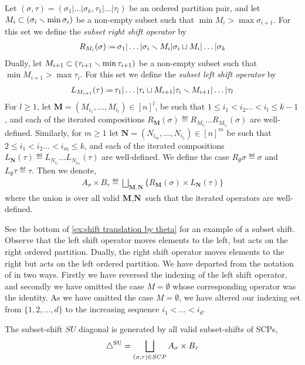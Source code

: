 \begin{definition} \label{def:subset shifts}
Let $(\sigma,\tau) = (\sigma_1|\dots|\sigma_k,\tau_1|\dots|\tau_l)$ be an ordered partition pair, and let $M_i\subset (\sigma_{i}\smallsetminus \min \sigma_{i})$ be a non-empty subset such that $\min M_i> \max \sigma_{i+1}$.
For this set we define the \emph{subset right shift operator} by
\begin{align*}
    R_{M_i}(\sigma) \eqdef  \sigma_1|\dots|\sigma_i \ssm M_i|\sigma_i \sqcup M_i|\dots|\sigma_k
\end{align*}
Dually, let $M_{i+1}\subset (\tau_{i+1}\smallsetminus \min \tau_{i+1})$  be a non-empty subset such that $\min M_{i+1}> \max \tau_{i}$.
For this set we define the \emph{subset left shift operator} by
\begin{align*}
    L_{M_{i+1}}(\tau) \eqdef  \tau_1|\dots|\tau_i \sqcup M_{i+1}|\tau_i \ssm M_{i+1}|\dots|\tau_l
\end{align*}
For $l\geq 1$, let $\textbf{M} = (M_{i_1},\dots,M_{i_l}) \in [n]^{l}$, be such that $1\leq i_1 < i_2 \dots < i_l\leq k-1$, and each of the iterated compositions $R_\mathbf{M}(\sigma)  \eqdef  R_{M_{i_l}}\dots R_{M_{i_1}}(\sigma)$ are well-defined.
Similarly, for $m\geq 1$ let $\textbf{N} = (N_{i_m},\dots,N_{i_1}) \in [n]^{m}$ be such that $2\leq i_1 < i_2 \dots < i_m\leq k$, and each of the iterated compositions  $L_\mathbf{N}(\tau)  \eqdef  L_{N_{i_1}}\dots L_{N_{i_m}}(\tau)$ are well-defined.
We define the case $R_{\emptyset}\sigma  \eqdef  \sigma$ and $L_{\emptyset}\tau  \eqdef  \tau$. Then we denote,
\begin{align*}
    A_{\sigma}\times B_\tau \eqdef  \bigsqcup_{\mathbf{M},\mathbf{N}} \{R_\mathbf{M}(\sigma)\times L_\mathbf{N}(\tau) \}
\end{align*}
where the union is over all valid $\textbf{M},\textbf{N}$ such that the iterated operators are well-defined.
\end{definition}

See the bottom of \cref{ex:shift translation by theta} for an example of a subset shift.
Observe that the left shift operator moves elements to the left, but acts on the right ordered partition.
Dually, the right shift operator moves elements to the right but acts on the left ordered partition.
We have departed from the notation of \cite{saneblidzeComparingDiagonalsAssociahedra2022} in two ways.
Firstly we have reversed the indexing of the left shift operator, and secondly we have omitted the case $M=\emptyset$ whose corresponding operator was the identity. 
As we have omitted the case $M=\emptyset$, we have altered our indexing set from $\{1,2,\dots,d\}$ to the increasing sequence $i_1<\dots<i_d$. 
\begin{proposition}
The subset-shift $SU$ diagonal is generated by all valid subset-shifts of SCPs,
\begin{align*}
    \triangle^{\mathrm{SU}} = \bigsqcup_{(\sigma,\tau) \in SCP} A_\sigma \times B_\tau
\end{align*}

\end{proposition}


